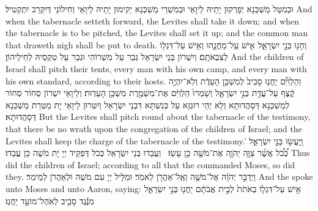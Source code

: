 {וּבְמִטַּל מַשְׁכְּנָא יְפָרְקוּן יָתֵיהּ לֵיוָאֵי וּבְמִשְׁרֵי מַשְׁכְּנָא יְקִימוּן יָתֵיהּ לֵיוָאֵי וְחִילוֹנַי דְּיִקְרַב יִתְקְטִיל׃}
{And when the tabernacle setteth forward, the Levites shall take it down; and when the tabernacle is to be pitched, the Levites shall set it up; and the common man that draweth nigh shall be put to death.}{}
{וְחָנ֖וּ בְּנֵ֣י יִשְׂרָאֵ֑ל אִ֧ישׁ עַֽל־מַחֲנֵ֛הוּ וְאִ֥ישׁ עַל־דִּגְל֖וֹ לְצִבְאֹתָֽם׃
}
{וְיִשְׁרוֹן בְּנֵי יִשְׂרָאֵל גְּבַר עַל מִשְׁרוֹהִי וּגְבַר עַל טִקְסֵיהּ לְחֵילֵיהוֹן׃}
{And the children of Israel shall pitch their tents, every man with his own camp, and every man with his own standard, according to their hosts.}{}
{וְהַלְוִיִּ֞ם יַחֲנ֤וּ סָבִיב֙ לְמִשְׁכַּ֣ן הָעֵדֻ֔ת וְלֹֽא־יִהְיֶ֣ה קֶ֔צֶף עַל־עֲדַ֖ת בְּנֵ֣י יִשְׂרָאֵ֑ל וְשָׁמְרוּ֙ הַלְוִיִּ֔ם אֶת־מִשְׁמֶ֖רֶת מִשְׁכַּ֥ן הָעֵדֽוּת׃
}
{וְלֵיוָאֵי יִשְׁרוֹן סְחוֹר סְחוֹר לְמַשְׁכְּנָא דְּסָהֲדוּתָא וְלָא יְהֵי רוּגְזָא עַל כְּנִשְׁתָּא דִּבְנֵי יִשְׂרָאֵל וְיִטְּרוּן לֵיוָאֵי יָת מַטְּרַת מַשְׁכְּנָא דְּסָהֲדוּתָא׃}
{But the Levites shall pitch round about the tabernacle of the testimony, that there be no wrath upon the congregation of the children of Israel; and the Levites shall keep the charge of the tabernacle of the testimony.’}{}
{וַֽיַּעֲשׂ֖וּ בְּנֵ֣י יִשְׂרָאֵ֑ל כְּ֠כֹ֠ל אֲשֶׁ֨ר צִוָּ֧ה יְהֹוָ֛ה אֶת־מֹשֶׁ֖ה כֵּ֥ן עָשֽׂוּ׃ \petucha }
{וַעֲבַדוּ בְּנֵי יִשְׂרָאֵל כְּכֹל דְּפַקֵּיד יְיָ יָת מֹשֶׁה כֵּן עֲבַדוּ׃}
{Thus did the children of Israel; according to all that the \lord\space commanded Moses, so did they.}{}
\newperek
{}%
{וַיְדַבֵּ֣ר יְהֹוָ֔ה אֶל־מֹשֶׁ֥ה וְאֶֽל־אַהֲרֹ֖ן לֵאמֹֽר׃}
{וּמַלֵּיל יְיָ עִם מֹשֶׁה וּלְאַהֲרֹן לְמֵימַר׃}
{And the \lord\space spoke unto Moses and unto Aaron, saying:}{}
{אִ֣ישׁ עַל־דִּגְל֤וֹ בְאֹתֹת֙ לְבֵ֣ית אֲבֹתָ֔ם יַחֲנ֖וּ בְּנֵ֣י יִשְׂרָאֵ֑ל מִנֶּ֕גֶד סָבִ֥יב לְאֹֽהֶל־מוֹעֵ֖ד יַחֲנֽוּ׃
}
